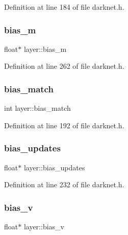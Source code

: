 Definition at line 184 of file darknet.\+h.

\mbox{\label{structlayer_acfe31e9816074f6118b1dfaa7c55e53f}} 
\subsubsection{\texorpdfstring{bias\_m}{bias\_m}}
{\footnotesize\ttfamily float$\ast$ layer\+::bias\+\_\+m}



Definition at line 262 of file darknet.\+h.

\mbox{\label{structlayer_a9f5919edff3bdaa0e3f02f13728415c3}} 
\subsubsection{\texorpdfstring{bias\_match}{bias\_match}}
{\footnotesize\ttfamily int layer\+::bias\+\_\+match}



Definition at line 192 of file darknet.\+h.

\mbox{\label{structlayer_a53f11ac2a72b28b8c3529b799f1662fd}} 
\subsubsection{\texorpdfstring{bias\_updates}{bias\_updates}}
{\footnotesize\ttfamily float$\ast$ layer\+::bias\+\_\+updates}



Definition at line 232 of file darknet.\+h.

\mbox{\label{structlayer_a52052221eb80a84d1486c79ede9a1477}} 
\subsubsection{\texorpdfstring{bias\_v}{bias\_v}}
{\footnotesize\ttfamily float$\ast$ layer\+::bias\+\_\+v}



